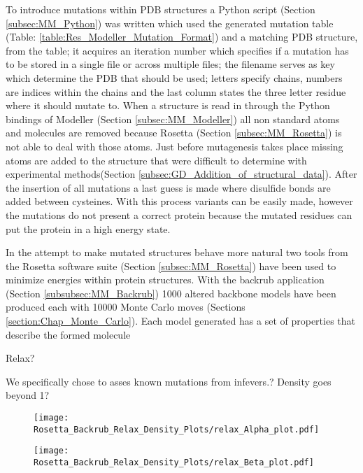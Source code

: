 	\newpage
	To introduce mutations within PDB structures a Python script (Section \ref{subsec:MM_Python}) was written which used the generated mutation table (Table: \ref{table:Res_Modeller_Mutation_Format}) and a matching PDB structure, from the table; it acquires an iteration number which specifies if a mutation has to be stored in a single file or across multiple files; the filename serves as key which determine the PDB that should be used; letters specify chains, numbers are indices within the chains and the last column states the three letter residue where it should mutate to. When a structure is read in through the Python bindings of Modeller (Section \ref{subsec:MM_Modeller}) all non standard atoms and molecules are removed because Rosetta (Section \ref{subsec:MM_Rosetta}) is not able to deal with those atoms. Just before mutagenesis takes place missing atoms are added to the structure that were difficult to determine with experimental methods(Section \ref{subsec:GD_Addition_of_structural_data}). After the insertion of all mutations a last guess is made where disulfide bonds are added between cysteines. With this process variants can be easily made, however the mutations do not present a correct protein because the mutated residues can put the protein in a high energy state.
	
	In the attempt to make mutated structures behave more natural two tools from the Rosetta software suite (Section \ref{subsec:MM_Rosetta}) have been used to minimize energies within protein structures. With the backrub application (Section \ref{subsubsec:MM_Backrub}) 1000 altered backbone models have been produced each with 10000 Monte Carlo moves (Sections \ref{section:Chap_Monte_Carlo}). Each model generated has a set of properties that describe the formed molecule 
	
	Relax? 
	
	We specifically chose to asses known mutations from infevers.?
	Density goes beyond 1?
	
	
	\newpage
	\begin{figure}[!ht]
		\centering
		\texttt{[image: Rosetta\_Backrub\_Relax\_Density\_Plots/relax\_Alpha\_plot.pdf]}
		\caption[TNF-$\alpha$ relax score plots]{}
		\label{fig:relax_TNFA_scores}
	\end{figure}

	\newpage
		
	\begin{figure}[!ht]
		\centering
		\texttt{[image: Rosetta\_Backrub\_Relax\_Density\_Plots/relax\_Beta\_plot.pdf]}
		\caption[TNF-$\beta$ relax score plots]{}
		\label{fig:relax_TNFB_scores}
	\end{figure}


